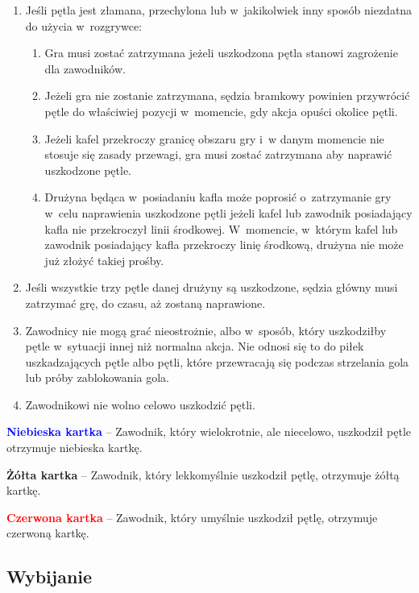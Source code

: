 \documentclass[12pt,a4paper]{article}
\newcommand\redcard[1]{\bgroup\textcolor{red}{\textbf{#1}}}
\newcommand\yellowcard[1]{\bgroup\textcolor{darkyellow}{\textbf{#1}}}
\newcommand\bluecard[1]{\bgroup\textcolor{blue}{\textbf{#1}}}
\begin{document}
\begin{enumerate}
	\item
	      Jeśli pętla jest złamana, przechylona lub w~jakikolwiek inny sposób
	      niezdatna do użycia w~rozgrywce:

	      \begin{enumerate}
		      \item
		            Gra musi zostać zatrzymana jeżeli uszkodzona pętla stanowi
		            zagrożenie dla zawodników.
		      \item
		            Jeżeli gra nie zostanie zatrzymana, sędzia bramkowy powinien
		            przywrócić pętle do właściwiej pozycji w~momencie, gdy akcja opuści
		            okolice pętli.
		      \item
		            Jeżeli kafel przekroczy granicę obszaru gry i~w danym momencie nie
		            stosuje się zasady przewagi, gra musi zostać zatrzymana aby naprawić
		            uszkodzone pętle.
		      \item
		            Drużyna będąca w~posiadaniu kafla może poprosić o~zatrzymanie gry w~celu naprawienia uszkodzone pętli jeżeli kafel lub zawodnik
		            posiadający kafla nie przekroczył linii środkowej. W~momencie, w~którym kafel lub zawodnik posiadający kafla przekroczy linię
		            środkową, drużyna nie może już złożyć takiej prośby.
	      \end{enumerate}
	\item
	      Jeśli wszystkie trzy pętle danej drużyny są uszkodzone, sędzia główny
	      musi zatrzymać grę, do czasu, aż zostaną naprawione.
	\item
	      Zawodnicy nie mogą grać nieostrożnie, albo w~sposób, który
	      uszkodziłby pętle w~sytuacji innej niż normalna akcja. Nie odnosi się to do
	      piłek uszkadzających pętle albo pętli, które przewracają się podczas
	      strzelania gola lub próby zablokowania gola.
	\item
	      Zawodnikowi nie wolno celowo uszkodzić pętli.
\end{enumerate}

\bluecard{Niebieska kartka} -- Zawodnik, który wielokrotnie, ale niecelowo,
uszkodził pętle otrzymuje niebieska kartkę.

\yellowcard{Żółta kartka} -- Zawodnik, który lekkomyślnie uszkodził pętlę,
otrzymuje żółtą kartkę.

\redcard{Czerwona kartka} -- Zawodnik, który umyślnie uszkodził
pętlę, otrzymuje czerwoną kartkę.

\subsection{Wybijanie}
\end{document}
